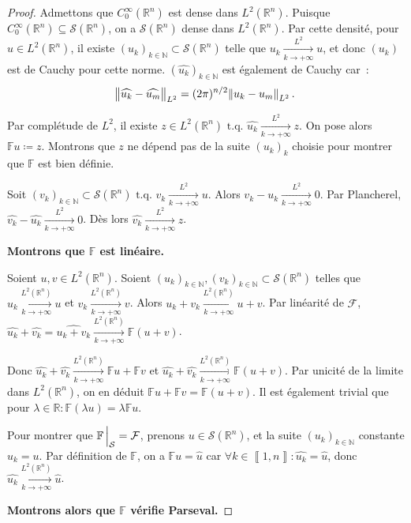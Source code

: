 \documentclass{report}
\newcommand{\R}{{\mathbb R}}
\newcommand{\N}{{\mathbb N}}
\newcommand{\tq}{\text{ t.q. }}
\newcommand{\pinfty}{{+\infty}}
\newcommand{\intint}[2]{{\left\llbracket#1, #2\right\rrbracket}}
\theoremstyle{definition}
\theoremstyle{remark}
\begin{document}
\begin{proof} Admettons que $C_0^\infty(\R^n)$ est dense dans $L^2(\R^n)$. Puisque $C_0^\infty(\R^n) \subseteq \mathcal S(\R^n)$, on a $\mathcal S(\R^n)$ dense dans $L^2(\R^n)$.
Par cette densité, pour $u \in L^2(\R^n)$, il existe $(u_k)_{k \in \N} \subset \mathcal S(\R^n)$ telle que $u_k \xrightarrow[k \to \pinfty]{L^2} u$, et donc $(u_k)$ est de
Cauchy pour cette norme. $(\widehat {u_k})_{k \in \N}$ est également de Cauchy car~:
\[\norm {\widehat {u_k} - \widehat {u_m}}_{L^2} = (2\pi)^{n/2}\norm {u_k - u_m}_{L^2}.\]

Par complétude de $L^2$, il existe $z \in L^2(\R^n) \tq \widehat {u_k} \xrightarrow[k \to \pinfty]{L^2} z$. On pose alors $\mathbb Fu \coloneqq z$. Montrons que $z$ ne dépend pas
de la suite $(u_k)_k$ choisie pour montrer que $\mathbb F$ est bien définie.

Soit $(v_k)_{k \in \N} \subset \mathcal S(\R^n) \tq v_k \xrightarrow[k \to \pinfty]{L^2} u$. Alors $v_k-u_k \xrightarrow[k \to \pinfty]{L^2} 0$. Par Plancherel,
$\widehat {v_k}-\widehat {u_k} \xrightarrow[k \to \pinfty]{L^2} 0$. Dès lors $\widehat {v_k} \xrightarrow[k \to \pinfty]{L^2} z$.

\textbf{Montrons que $\mathbb F$ est linéaire.}

Soient $u, v \in L^2(\R^n)$. Soient $(u_k)_{k \in \N}, (v_k)_{k \in \N} \subset \mathcal S(\R^n)$ telles que $u_k \xrightarrow[k \to \pinfty]{L^2(\R^n)} u$ et
$v_k \xrightarrow[k \to \pinfty]{L^2(\R^n)} v$. Alors $u_k+v_k \xrightarrow[k \to \pinfty]{L^2(\R^n)} u+v$. Par linéarité de $\mathcal F$,
$\widehat {u_k} + \widehat {v_k} = \widehat {u_k + v_k} \xrightarrow[k \to \pinfty]{L^2(\R^n)} \mathbb F(u+v)$.

Donc $\widehat {u_k} + \widehat {v_k} \xrightarrow[k \to \pinfty]{L^2(\R^n)} \mathbb Fu + \mathbb Fv$ et
$\widehat {u_k} + \widehat {v_k} \xrightarrow[k \to \pinfty]{L^2(\R^n)} \mathbb F(u+v)$. Par unicité de la limite dans $L^2(\R^n)$, on en déduit
$\mathbb F u + \mathbb F v = \mathbb F(u+v)$. Il est également trivial que pour $\lambda \in \R : \mathbb F(\lambda u) = \lambda \mathbb Fu$.

Pour montrer que $\mathbb F\sVert[2]_{\mathcal S} = \mathcal F$, prenons $u \in \mathcal S(\R^n)$, et la suite $(u_k)_{k \in \N}$ constante $u_k = u$. Par définition de $\mathbb F$,
on a $\mathbb Fu = \hat u$ car $\forall k \in \intint 1n : \widehat {u_k} = \hat u$, donc $\widehat {u_k} \xrightarrow[k \to \pinfty]{L^2(\R^n)} \hat u$.

\textbf{Montrons alors que $\mathbb F$  vérifie Parseval.}


\end{proof}
\end{document}
